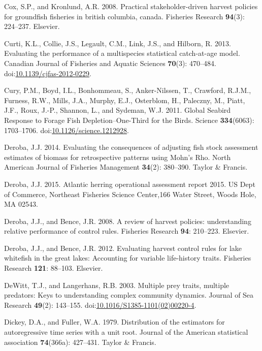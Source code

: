 \documentclass[]{article}
\begin{document}
\hypertarget{ref-cox2008practical}{}
Cox, S.P., and Kronlund, A.R. 2008. Practical stakeholder-driven harvest
policies for groundfish fisheries in british columbia, canada. Fisheries
Research \textbf{94}(3): 224--237. Elsevier.

\hypertarget{ref-curti_evaluating_2013}{}
Curti, K.L., Collie, J.S., Legault, C.M., Link, J.S., and Hilborn, R.
2013. Evaluating the performance of a multispecies statistical
catch-at-age model. Canadian Journal of Fisheries and Aquatic Sciences
\textbf{70}(3): 470--484.
doi:\href{https://doi.org/10.1139/cjfas-2012-0229}{10.1139/cjfas-2012-0229}.

\hypertarget{ref-cury_global_2011}{}
Cury, P.M., Boyd, I.L., Bonhommeau, S., Anker-Nilssen, T., Crawford,
R.J.M., Furness, R.W., Mills, J.A., Murphy, E.J., Osterblom, H.,
Paleczny, M., Piatt, J.F., Roux, J.-P., Shannon, L., and Sydeman, W.J.
2011. Global Seabird Response to Forage Fish Depletion--One-Third for
the Birds. Science \textbf{334}(6063): 1703--1706.
doi:\href{https://doi.org/10.1126/science.1212928}{10.1126/science.1212928}.

\hypertarget{ref-Deroba2014EvaluatingRho}{}
Deroba, J.J. 2014. Evaluating the consequences of adjusting fish stock
assessment estimates of biomass for retrospective patterns using Mohn's
Rho. North American Journal of Fisheries Management \textbf{34}(2):
380--390. Taylor \& Francis.

\hypertarget{ref-Deroba2015atlantic}{}
Deroba, J.J. 2015. Atlantic herring operational assessment report 2015.
US Dept of Commerce, Northeast Fisheries Science Center,166 Water
Street, Woods Hole, MA 02543.

\hypertarget{ref-Deroba2008}{}
Deroba, J.J., and Bence, J.R. 2008. A review of harvest policies:
understanding relative performance of control rules. Fisheries Research
\textbf{94}: 210--223. Elsevier.

\hypertarget{ref-Deroba2012Evaluating}{}
Deroba, J.J., and Bence, J.R. 2012. Evaluating harvest control rules for
lake whitefish in the great lakes: Accounting for variable life-history
traits. Fisheries Research \textbf{121}: 88--103. Elsevier.

\hypertarget{ref-dewitt_multiple_2003}{}
DeWitt, T.J., and Langerhans, R.B. 2003. Multiple prey traits, multiple
predators: Keys to understanding complex community dynamics. Journal of
Sea Research \textbf{49}(2): 143--155.
doi:\href{https://doi.org/10.1016/S1385-1101(02)00220-4}{10.1016/S1385-1101(02)00220-4}.

\hypertarget{ref-Dickey1979DistributionRoot}{}
Dickey, D.A., and Fuller, W.A. 1979. Distribution of the estimators for
autoregressive time series with a unit root. Journal of the American
statistical association \textbf{74}(366a): 427--431. Taylor \& Francis.
\end{document}
